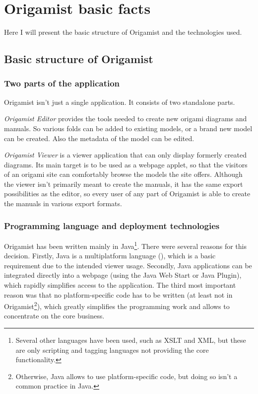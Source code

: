 \chapter{Origamist basic facts}

Here I will present the basic structure of Origamist and the technologies used.

\section{Basic structure of Origamist}

\subsection{Two parts of the application}
Origamist isn't just a single application. It consists of two standalone parts. 

\emph{Origamist Editor} provides the tools needed to create new origami diagrams and manuals. So various folds can be added to existing models, or a brand new model can be created. Also the metadata of the model can be edited.

\emph{Origamist Viewer} is a viewer application that can only display formerly created diagrams. Its main target is to be used as a webpage applet, so that the visitors of an origami site can comfortably browse the models the site offers. Although the viewer isn't primarily meant to create the manuals, it has the same export possibilities as the editor, so every user of any part of Origamist is able to create the manuals in various export formats.

\subsection{Programming language and deployment technologies}
Origamist has been written mainly in Java\footnote{Several other languages have been used, such as XSLT and XML, but these are only scripting and tagging languages not providing the core functionality.}. There were several reasons for this decision. Firstly, Java is a multiplatform language (\cite{javasupport}), which is a basic requirement due to the intended viewer usage. Secondly, Java applications can be integrated directly into a webpage (using the Java Web Start or Java Plugin), which rapidly simplifies access to the application.  The third most important reason was that no platform-specific code has to be written (at least not in Origamist\footnote{Otherwise, Java allows to use platform-specific code, but doing so isn't a common practice in Java.}), which greatly simplifies the programming work and allows to concentrate on the core business.

